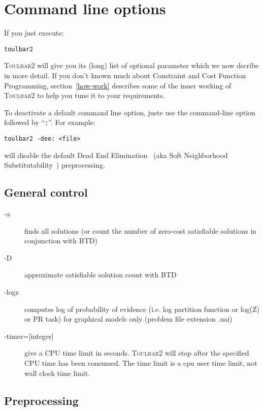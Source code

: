 \documentclass{article}
\def\toulbar2{\textsc{Toulbar2}}
\begin{document}
\section{Command line options}

If you just execute:

\begin{verbatim}
toulbar2
\end{verbatim}

\toulbar2 will give you its (long) list of optional parameter which we
now dscribe in more detail. If you don't known much about Constraint
and Cost Function Programming, section~\ref{how-work} describes some
of the inner working of \toulbar2 to help you tune it to your
requirements.

To deactivate a default command line option, juste use the
command-line option followed by ``\texttt{:}''. For example:

\begin{verbatim}
toulbar2 -dee: <file>
\end{verbatim}

will disable the default Dead End Elimination~\cite{} (aka Soft Neighborhood
Substitutability~\cite{}) preprocessing.


\subsection{General control}

\begin{description}
\item[{-a}] finds all solutions (or count the number of zero-cost
  satisfiable solutions in conjunction with BTD)
\item[{-D}] approximate satisfiable solution count with BTD
\item[{-logz}] computes log of probability of evidence (i.e. log
  partition function or log(Z) or PR task) for graphical models only
  (problem file extension .uai)
\item[{-timer=[integer]}] give a CPU time limit in seconds. \toulbar2
  will stop after the specified CPU time has been consumed. The time
  limit is a cpu user time limit, not wall clock time limit.
\end{description}
 
\subsection{Preprocessing}
\end{document}
